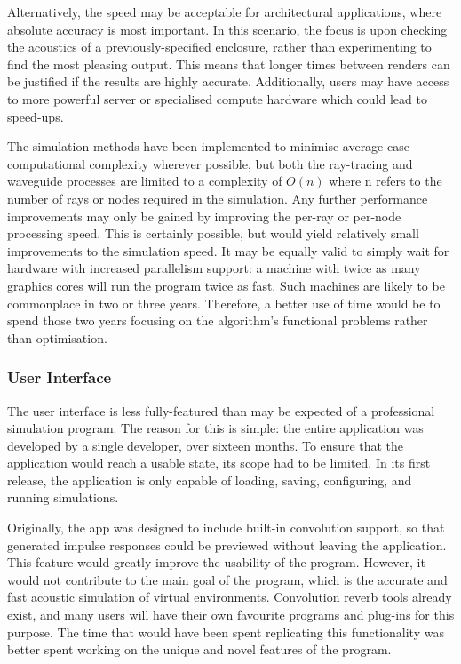 \documentclass[]{scrreprt}
\begin{document}
Alternatively, the speed may be acceptable for architectural
applications, where absolute accuracy is most important. In this
scenario, the focus is upon checking the acoustics of a
previously-specified enclosure, rather than experimenting to find the
most pleasing output. This means that longer times between renders can
be justified if the results are highly accurate. Additionally, users may
have access to more powerful server or specialised compute hardware
which could lead to speed-ups.

The simulation methods have been implemented to minimise average-case
computational complexity wherever possible, but both the ray-tracing and
waveguide processes are limited to a complexity of \(O(n)\) where n
refers to the number of rays or nodes required in the simulation. Any
further performance improvements may only be gained by improving the
per-ray or per-node processing speed. This is certainly possible, but
would yield relatively small improvements to the simulation speed. It
may be equally valid to simply wait for hardware with increased
parallelism support: a machine with twice as many graphics cores will
run the program twice as fast. Such machines are likely to be
commonplace in two or three years. Therefore, a better use of time would
be to spend those two years focusing on the algorithm's functional
problems rather than optimisation.

\subsubsection{User Interface}\label{user-interface}

The user interface is less fully-featured than may be expected of a
professional simulation program. The reason for this is simple: the
entire application was developed by a single developer, over sixteen
months. To ensure that the application would reach a usable state, its
scope had to be limited. In its first release, the application is only
capable of loading, saving, configuring, and running simulations.

Originally, the app was designed to include built-in convolution
support, so that generated impulse responses could be previewed without
leaving the application. This feature would greatly improve the
usability of the program. However, it would not contribute to the main
goal of the program, which is the accurate and fast acoustic simulation
of virtual environments. Convolution reverb tools already exist, and
many users will have their own favourite programs and plug-ins for this
purpose. The time that would have been spent replicating this
functionality was better spent working on the unique and novel features
of the program.
\end{document}
